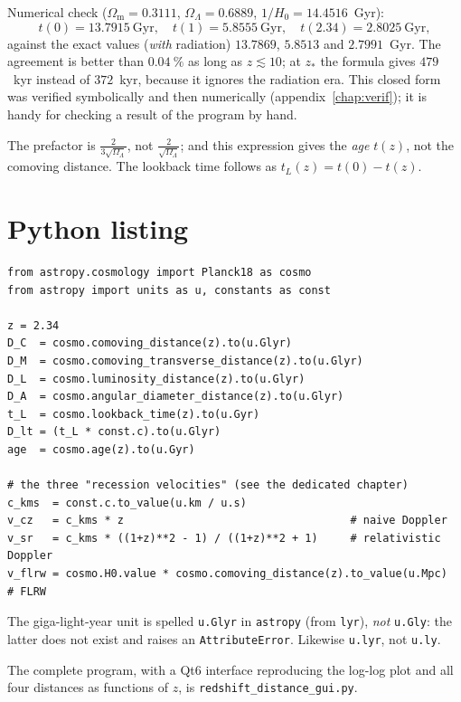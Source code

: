 \documentclass[11pt,a4paper,openany]{report}
\newcommand{\Gyr}{\text{Gyr}}
\newcommand{\Hzero}{H_{0}}
\newcommand{\Om}{\Omega_{\mathrm{m}}}
\newcommand{\OL}{\Omega_{\Lambda}}
\begin{document}
\noindent Numerical check ($\Om = 0.3111$, $\OL = 0.6889$,
$1/\Hzero = 14.4516$~Gyr):
\[
t(0) = 13.7915~\Gyr, \quad t(1) = 5.8555~\Gyr, \quad
t(2.34) = 2.8025~\Gyr,
\]
against the exact values (\emph{with} radiation) $13.7869$, $5.8513$ and
$2.7991$~Gyr. The agreement is better than $0.04~\%$ as long as
$z \lesssim 10$; at $z_{*}$ the formula gives $479$~kyr instead of $372$~kyr,
because it ignores the radiation era. This closed form was verified
symbolically and then numerically (appendix~\ref{chap:verif}); it is handy for
checking a result of the program by hand.

\begin{tcolorbox}[warning]
The prefactor is $\tfrac{2}{3\sqrt{\OL}}$, not $\tfrac{2}{\sqrt{\OL}}$; and
this expression gives the \emph{age} $t(z)$, not the comoving distance. The
lookback time follows as $t_{L}(z) = t(0) - t(z)$.
\end{tcolorbox}

\section{Python listing}

\begin{verbatim}
from astropy.cosmology import Planck18 as cosmo
from astropy import units as u, constants as const

z = 2.34
D_C  = cosmo.comoving_distance(z).to(u.Glyr)
D_M  = cosmo.comoving_transverse_distance(z).to(u.Glyr)
D_L  = cosmo.luminosity_distance(z).to(u.Glyr)
D_A  = cosmo.angular_diameter_distance(z).to(u.Glyr)
t_L  = cosmo.lookback_time(z).to(u.Gyr)
D_lt = (t_L * const.c).to(u.Glyr)
age  = cosmo.age(z).to(u.Gyr)

# the three "recession velocities" (see the dedicated chapter)
c_kms  = const.c.to_value(u.km / u.s)
v_cz   = c_kms * z                                   # naive Doppler
v_sr   = c_kms * ((1+z)**2 - 1) / ((1+z)**2 + 1)     # relativistic Doppler
v_flrw = cosmo.H0.value * cosmo.comoving_distance(z).to_value(u.Mpc)   # FLRW
\end{verbatim}

\begin{tcolorbox}[warning]
The giga-light-year unit is spelled \texttt{u.Glyr} in \texttt{astropy} (from
\texttt{lyr}), \emph{not} \texttt{u.Gly}: the latter does not exist and raises
an \texttt{AttributeError}. Likewise \texttt{u.lyr}, not \texttt{u.ly}.
\end{tcolorbox}

\noindent The complete program, with a Qt6 interface reproducing the log-log
plot and all four distances as functions of $z$, is
\texttt{redshift\_distance\_gui.py}.
\end{document}

